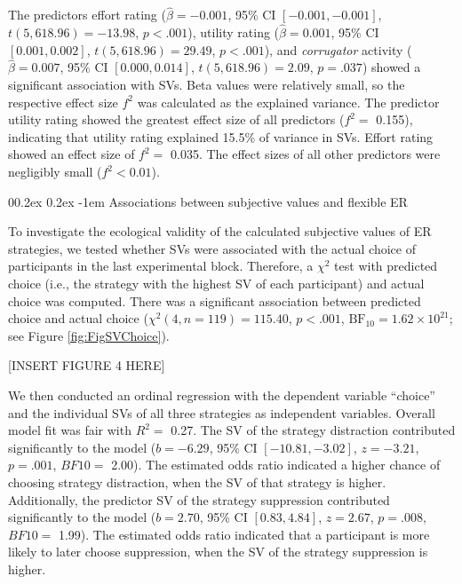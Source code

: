 \documentclass[
  man,floatsintext]{apa6}
\makeatletter
\let\oldparagraph\paragraph
\renewcommand{\paragraph}[1]{\oldparagraph{#1}\mbox{}}
\renewcommand{\paragraph}{\@startsection{paragraph}{4}{\parindent}%
  {0\baselineskip \@plus 0.2ex \@minus 0.2ex}%
  {-1em}%
  {\normalfont\normalsize\bfseries\itshape\typesectitle}}
\makeatother
\begin{document}
The predictors effort rating (\(\hat{\beta} = -0.001\), 95\% CI \([-0.001, -0.001]\), \(t(5,618.96) = -13.98\), \(p < .001\)), utility rating (\(\hat{\beta} = 0.001\), 95\% CI \([0.001, 0.002]\), \(t(5,618.96) = 29.49\), \(p < .001\)), and \emph{corrugator} activity (\(\hat{\beta} = 0.007\), 95\% CI \([0.000, 0.014]\), \(t(5,618.96) = 2.09\), \(p = .037\)) showed a significant association with SVs.
Beta values were relatively small, so the respective effect size \(f^{2}\) was calculated as the explained variance.
The predictor utility rating showed the greatest effect size of all predictors (\(f^{2}=\) 0.155), indicating that utility rating explained 15.5\% of variance in SVs.
Effort rating showed an effect size of \(f^{2}=\) 0.035.
The effect sizes of all other predictors were negligibly small (\(f^{2}< 0.01\)).

\hypertarget{associations-between-subjective-values-and-flexible-er}{%
\paragraph{Associations between subjective values and flexible ER}\label{associations-between-subjective-values-and-flexible-er}}

To investigate the ecological validity of the calculated subjective values of ER strategies, we tested whether SVs were associated with the actual choice of participants in the last experimental block.
Therefore, a \(\chi^{2}\) test with predicted choice (i.e., the strategy with the highest SV of each participant) and actual choice was computed.
There was a significant association between predicted choice and actual choice (\(\chi^2(4, n = 119) = 115.40\), \(p < .001\), \(\mathrm{BF}_{\textrm{10}} = 1.62 \times 10^{21}\); see Figure \ref{fig:FigSVChoice}).

{[}INSERT FIGURE 4 HERE{]}

We then conducted an ordinal regression with the dependent variable ``choice'' and the individual SVs of all three strategies as independent variables.
Overall model fit was fair with \(R^{2}=\) 0.27.
The SV of the strategy distraction contributed significantly to the model (\(b = -6.29\), 95\% CI \([-10.81, -3.02]\), \(z = -3.21\), \(p = .001\), \(BF10=\) 2.00).
The estimated odds ratio indicated a higher chance of choosing strategy distraction, when the SV of that strategy is higher.
Additionally, the predictor SV of the strategy suppression contributed significantly to the model (\(b = 2.70\), 95\% CI \([0.83, 4.84]\), \(z = 2.67\), \(p = .008\), \(BF10=\) 1.99).
The estimated odds ratio indicated that a participant is more likely to later choose suppression, when the SV of the strategy suppression is higher.
\end{document}
